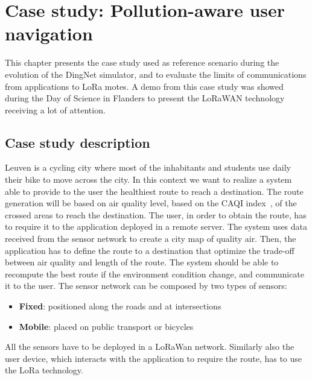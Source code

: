 \chapter{Case study: Pollution-aware user navigation}
\label{chap:case-staudyLoRa}

This chapter presents the case study used as reference scenario during the evolution of the DingNet simulator, and to evaluate the limits of communications from applications to LoRa motes. 
A demo from this case study was showed during the Day of Science in Flanders to present the LoRaWAN technology receiving a lot of attention.

\section{Case study description}
Leuven is a cycling city where most of the inhabitants and students use daily their bike to move across the city. 
In this context we want to realize a system able to provide to the user the healthiest route to reach a destination. 
The route generation will be based on air quality level, based on the CAQI index~\cite{CAQI}, of the crossed areas to reach the destination. 
The user, in order to obtain the route, has to require it to the application deployed in a remote server.
The system uses data received from the sensor network to create a city map of quality air.
Then, the application has to define the route to a destination that optimize the trade-off between air quality and length of the route.
The system should be able to recompute the best route if the environment condition change, and communicate it to the user.
The sensor network can be composed by two types of sensors:
\begin{itemize}
    \item \textbf{Fixed}: positioned along the roads and at intersections
    \item \textbf{Mobile}: placed on public transport or bicycles
\end{itemize}
All the sensors have to be deployed in a LoRaWan network.
Similarly also the user device, which interacts with the application to require the route, has to use the LoRa technology.

